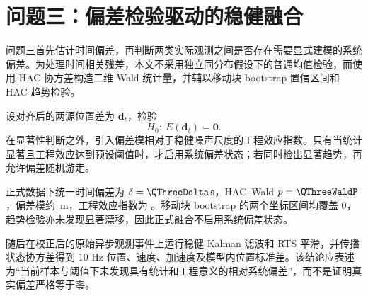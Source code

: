 \section{问题三：偏差检验驱动的稳健融合}

问题三首先估计时间偏差，再判断两类实际观测之间是否存在需要显式建模的系统偏差。为处理时间相关残差，本文不采用独立同分布假设下的普通均值检验，而使用 HAC 协方差构造二维 Wald 统计量，并辅以移动块 bootstrap 置信区间和 HAC 趋势检验。

设对齐后的两源位置差为 $\bm d_t$，检验
\[
H_0:\ E(\bm d_t)=\bm 0.
\]
在显著性判断之外，引入偏差模相对于稳健噪声尺度的工程效应指数。只有当统计显著且工程效应达到预设阈值时，才启用系统偏差状态；若同时检出显著趋势，再允许偏差随机游走。

正式数据下统一时间偏差为 $\delta=\QThreeDelta\,\mathrm{s}$，HAC--Wald $p=\QThreeWaldP$，偏差模约 \QThreeBiasNorm\,m，工程效应指数为 \QThreeEffectIndex。移动块 bootstrap 的两个坐标区间均覆盖 0，趋势检验亦未发现显著漂移，因此正式融合不启用系统偏差状态。

随后在校正后的原始异步观测事件上运行稳健 Kalman 滤波和 RTS 平滑，并传播状态协方差得到 10 Hz 位置、速度、加速度及模型内位置标准差。该结论应表述为“当前样本与阈值下未发现具有统计和工程意义的相对系统偏差”，而不是证明真实偏差严格等于零。



